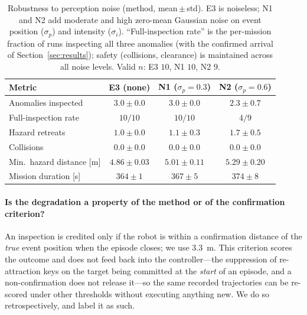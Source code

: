 \begin{table}[t]
\centering
\caption{Robustness to perception noise (method, mean\,$\pm$\,std). E3 is
noiseless; N1 and N2 add moderate and high zero-mean Gaussian noise on event
position ($\sigma_p$) and intensity ($\sigma_i$). ``Full-inspection rate'' is the
per-mission fraction of runs inspecting all three anomalies (with the confirmed
arrival of Section~\ref{sec:results}); safety (collisions, clearance) is
maintained across all noise levels. Valid $n$: E3 $10$, N1 $10$, N2 $9$.}
\label{tab:noise}
\footnotesize
\begin{tabular}{lccc}
\hline
\textbf{Metric} & \textbf{E3 (none)} &
\textbf{N1 ($\sigma_p{=}0.3$)} & \textbf{N2 ($\sigma_p{=}0.6$)}\\
\hline
Anomalies inspected       & $3.0\pm0.0$  & $3.0\pm0.0$  & $2.3\pm0.7$\\
Full-inspection rate      & $10/10$      & $10/10$      & $4/9$\\
Hazard retreats           & $1.0\pm0.0$  & $1.1\pm0.3$  & $1.7\pm0.5$\\
Collisions                & $0.0\pm0.0$  & $0.0\pm0.0$  & $0.0\pm0.0$\\
Min.\ hazard distance [m] & $4.86\pm0.03$& $5.01\pm0.11$& $5.29\pm0.20$\\
Mission duration [s]      & $364\pm1$    & $367\pm5$    & $374\pm8$\\
\hline
\end{tabular}
\end{table}

\paragraph*{Is the degradation a property of the method or of the confirmation
criterion?}
An inspection is credited only if the robot is within a confirmation distance of the
\emph{true} event position when the episode closes; we use $3.3$~m. This criterion
scores the outcome and does not feed back into the controller---the suppression of
re-attraction keys on the target being committed at the \emph{start} of an episode,
and a non-confirmation does not release it---so the same recorded trajectories can be
re-scored under other thresholds without executing anything new. We do so
retrospectively, and label it as such.

